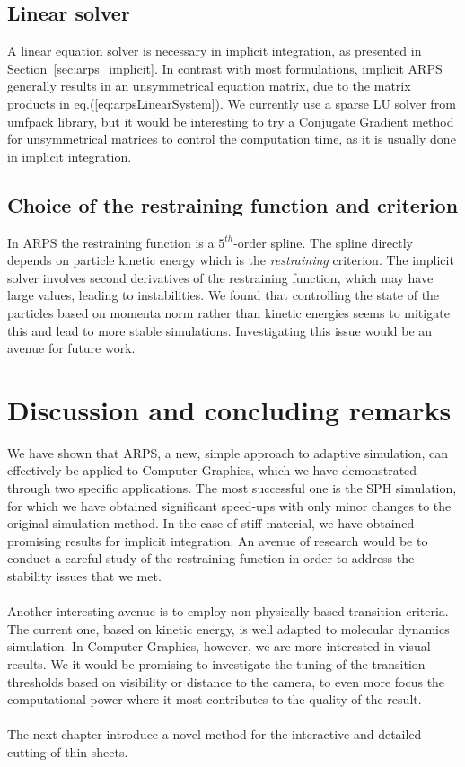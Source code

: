 \subsection{Linear solver}
A linear equation solver is necessary in implicit integration, as presented in Section~\ref{sec:arps_implicit}.
In contrast with most formulations, implicit ARPS generally results in an unsymmetrical equation matrix, due to the matrix products in eq.(\ref{eq:arpsLinearSystem}).
We currently use a sparse LU solver from umfpack library, but it would be interesting to try a Conjugate Gradient method for unsymmetrical matrices to control the computation time, as it is usually done in implicit integration.

\subsection{Choice of the restraining function and criterion}
In ARPS the restraining function is a $5^{th}$-order spline.
The spline directly depends on particle kinetic energy which is the \emph{restraining} criterion.
The implicit solver involves second derivatives of the restraining function, which may have large values, leading to instabilities.
We found that controlling the state of the particles based on momenta norm rather than kinetic energies seems to mitigate this and lead to more stable simulations.
Investigating this issue would be an avenue for future work.

\section{Discussion and concluding remarks} 
\label{sec:arps_discussion}
We have shown that ARPS, a new, simple approach to adaptive simulation, can effectively be applied to Computer Graphics, which we have demonstrated through two specific applications.
The most successful one is the SPH simulation, for which we have obtained significant speed-ups with only minor changes to the original simulation method.
In the case of stiff material, we have obtained promising results for implicit integration. 
An avenue of research would be to conduct a careful study of the restraining function in order to address the stability issues that we met.
\\ \\
Another interesting avenue is to employ non-physically-based transition criteria. 
The current one, based on kinetic energy, is well adapted to molecular dynamics simulation. 
In Computer Graphics, however, we are more interested in visual results. 
We it would be promising to investigate the tuning of the transition thresholds based on visibility or distance to the camera, to even more focus the computational power where it most contributes to the quality of the result.
\\ \\
The next chapter introduce a novel method for the interactive and detailed cutting of thin sheets.
